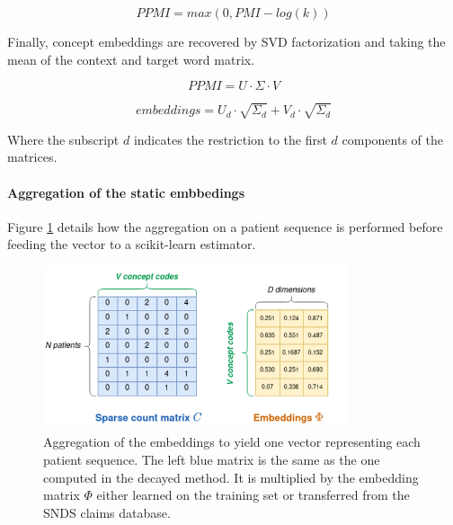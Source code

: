 \documentclass[french,12pt,twoside,a4paper]{book}
\begin{document}
\begin{appendices}
  \begin{equation}\label{eq:ppmi}
    PPMI = max(0, PMI - log(k))
  \end{equation}

  Finally, concept embeddings are recovered by SVD factorization and taking the
  mean of the context and target word matrix.

  \begin{equation}
    PPMI = U \cdot \Sigma \cdot V
  \end{equation}

  \begin{equation}
    embeddings = U_d \cdot \sqrt{\Sigma_d} + V_d \cdot \sqrt{\Sigma_d}
  \end{equation}

  Where the subscript $d$ indicates the restriction to the first $d$ components of
  the matrices.

  \paragraph{Aggregation of the static embbedings}

  Figure \ref{apd:fig:pipelines:static_embeddings_aggregation} details how the aggregation on a
  patient sequence is performed before feeding the vector to a scikit-learn estimator.

  \begin{figure}
    \centering
    \includegraphics[width=0.8\textwidth]{img/chapter_3/static_embeddings_aggregation.png}
    \caption{Aggregation of the embeddings to yield one vector representing each
      patient sequence. The left blue matrix is the same as the one computed in
      the decayed  method. It is multiplied by the embedding matrix $\Phi$ either
      learned on the training set or transferred from the SNDS claims database.
    }\label{apd:fig:pipelines:static_embeddings_aggregation}
  \end{figure}


\end{appendices}
\end{document}

